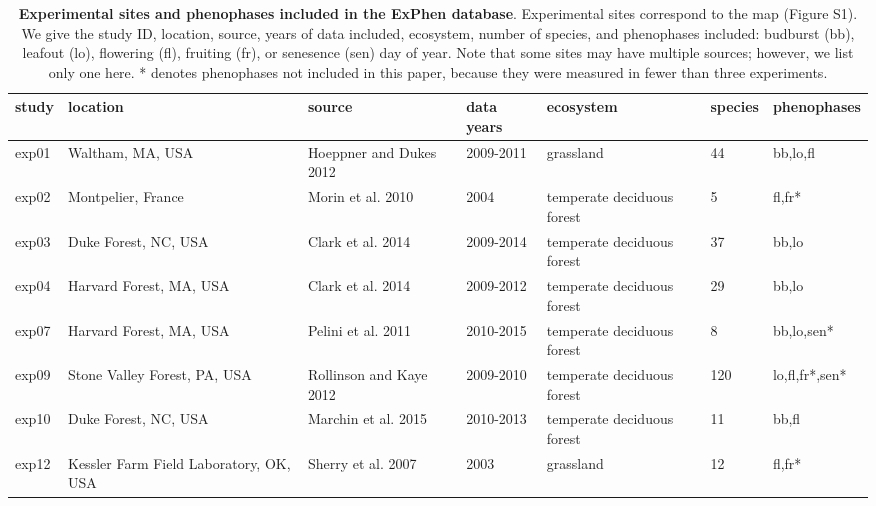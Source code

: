 \documentclass{article}
\begin{document}
\begin{table}[ht]
\centering
\caption{\textbf{Experimental sites and phenophases included in the ExPhen database}. Experimental sites correspond to the map (Figure S1). We give the study ID, location, source, years of data included, ecosystem, number of species, and phenophases included: budburst (bb), leafout (lo), flowering (fl), fruiting (fr), or senesence (sen) day of year. Note that some sites may have multiple sources; however, we list only one here. * denotes phenophases not included in this paper, because they were measured in fewer than three experiments.} 
\label{tab:studylocs}
\begingroup\footnotesize
\begin{tabular}{|p{}|p{}|p{}|p{}|p{}|p{}|p{}|}
  \hline
study & location & source & data years & ecosystem & species & phenophases \\ 
  \hline
exp01 & Waltham, MA, USA & Hoeppner and Dukes 2012 & 2009-2011 & grassland & 44 & bb,lo,fl \\ 
   \hline
exp02 & Montpelier, France & Morin et al. 2010 & 2004 & temperate deciduous forest & 5 & fl,fr* \\ 
   \hline
exp03 & Duke Forest, NC, USA & Clark et al. 2014 & 2009-2014 & temperate deciduous forest & 37 & bb,lo \\ 
   \hline
exp04 & Harvard Forest, MA, USA & Clark et al. 2014 & 2009-2012 & temperate deciduous forest & 29 & bb,lo \\ 
   \hline
exp07 & Harvard Forest, MA, USA & Pelini et al. 2011 & 2010-2015 & temperate deciduous forest & 8 & bb,lo,sen* \\ 
   \hline
exp09 & Stone Valley Forest, PA, USA & Rollinson and Kaye 2012 & 2009-2010 & temperate deciduous forest & 120 & lo,fl,fr*,sen* \\ 
   \hline
exp10 & Duke Forest, NC, USA & Marchin et al. 2015 & 2010-2013 & temperate deciduous forest & 11 & bb,fl \\ 
   \hline
exp12 & Kessler Farm Field Laboratory, OK, USA & Sherry et al. 2007 & 2003 & grassland & 12 & fl,fr* \\ 
   \hline
\end{tabular}
\endgroup
\end{table}%
\end{document}
